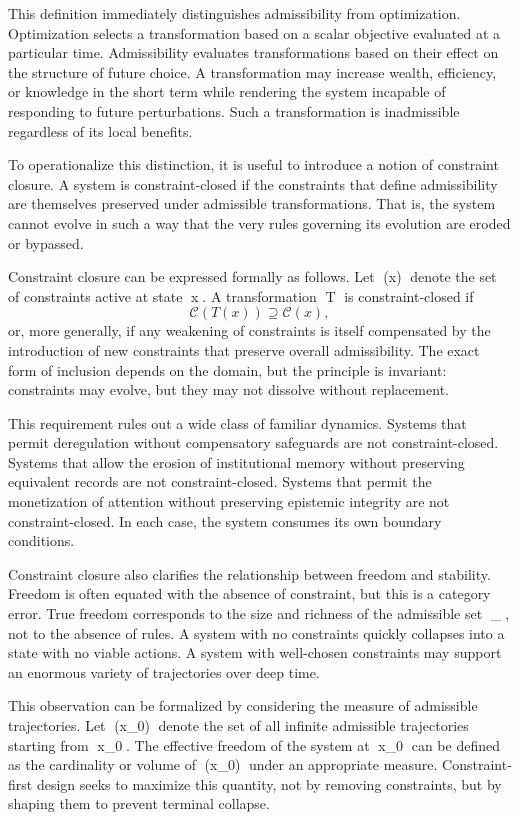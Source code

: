 \documentclass[12pt,oneside]{book}
\begin{document}
This definition immediately distinguishes admissibility from optimization. Optimization selects a transformation based on a scalar objective evaluated at a particular time. Admissibility evaluates transformations based on their effect on the structure of future choice. A transformation may increase wealth, efficiency, or knowledge in the short term while rendering the system incapable of responding to future perturbations. Such a transformation is inadmissible regardless of its local benefits.

To operationalize this distinction, it is useful to introduce a notion of constraint closure. A system is constraint-closed if the constraints that define admissibility are themselves preserved under admissible transformations. That is, the system cannot evolve in such a way that the very rules governing its evolution are eroded or bypassed.

Constraint closure can be expressed formally as follows. Let (x) denote the set of constraints active at state x. A transformation T is constraint-closed if
\[
\mathcal{C}(T(x)) \supseteq \mathcal{C}(x),
\]
or, more generally, if any weakening of constraints is itself compensated by the introduction of new constraints that preserve overall admissibility. The exact form of inclusion depends on the domain, but the principle is invariant: constraints may evolve, but they may not dissolve without replacement.

This requirement rules out a wide class of familiar dynamics. Systems that permit deregulation without compensatory safeguards are not constraint-closed. Systems that allow the erosion of institutional memory without preserving equivalent records are not constraint-closed. Systems that permit the monetization of attention without preserving epistemic integrity are not constraint-closed. In each case, the system consumes its own boundary conditions.

Constraint closure also clarifies the relationship between freedom and stability. Freedom is often equated with the absence of constraint, but this is a category error. True freedom corresponds to the size and richness of the admissible set _{}, not to the absence of rules. A system with no constraints quickly collapses into a state with no viable actions. A system with well-chosen constraints may support an enormous variety of trajectories over deep time.

This observation can be formalized by considering the measure of admissible trajectories. Let \Gamma(x_0) denote the set of all infinite admissible trajectories starting from x_0. The effective freedom of the system at x_0 can be defined as the cardinality or volume of \Gamma(x_0) under an appropriate measure. Constraint-first design seeks to maximize this quantity, not by removing constraints, but by shaping them to prevent terminal collapse.
\end{document}
